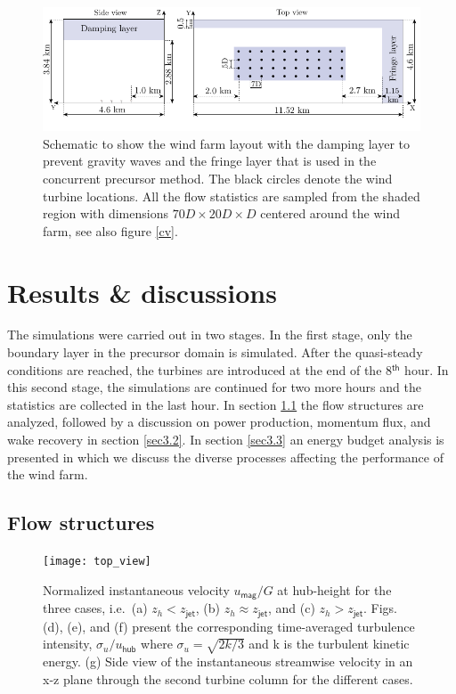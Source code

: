 \documentclass[%
 aip,
 amsmath,amssymb,
preprint,%
author-numerical,%
]{revtex4-1}
\begin{document}
\begin{figure} 
 \centering
 \includegraphics[width=\linewidth]{fig2}
 \vspace{-1.3cm}
 \caption{Schematic to show the wind farm layout with the damping layer to prevent gravity waves and the fringe layer that is used in the concurrent precursor method. The black circles denote the wind turbine locations. All the flow statistics are sampled from the shaded region with dimensions $70D\times{20D}\times{D}$ centered around the wind farm, see also figure \ref{cv}.}
 \label{fig2}
\end{figure}

\section{Results \& discussions}\label{sec3}
The simulations were carried out in two stages. In the first stage, only the boundary layer in the precursor domain is simulated. After the quasi-steady conditions are reached, the turbines are introduced at the end of the 8$^\mathsf{th}$ hour. In this second stage, the simulations are continued for two more hours and the statistics are collected in the last hour. In section \ref{sec3.1} the flow structures are analyzed, followed by a discussion on power production, momentum flux, and wake recovery in section \ref{sec3.2}. In section \ref{sec3.3} an energy budget analysis is presented in which we discuss the diverse processes affecting the performance of the wind farm.

\subsection{Flow structures}\label{sec3.1}
\begin{figure}
 \centering
 \texttt{[image: top\_view]}
 \caption{Normalized instantaneous velocity $u_\mathsf{mag}/G$ at hub-height for the three cases, i.e.\ (a) $z_h < z_\mathsf{jet}$, (b) $z_h \approx z_\mathsf{jet}$, and (c) $z_h > z_\mathsf{jet}$. Figs. (d), (e), and (f) present the corresponding time-averaged turbulence intensity, $\sigma_{u}/u_\mathsf{hub}$ where $\sigma_{u}=\sqrt{2k/3}$ and k is the turbulent kinetic energy. (g) Side view of the instantaneous streamwise velocity in an x-z plane through the second turbine column for the different cases.}
 \label{topview}
\end{figure}
\end{document}
